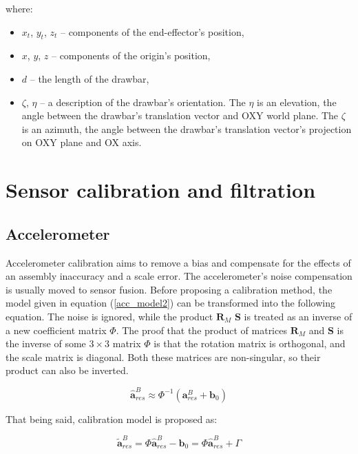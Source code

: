where:
\begin{itemize}
	\item $x_t$, $y_t$, $z_t$ -- components of the end-effector's position,
	\item $x$, $y$, $z$ -- components of the origin's position,
	\item $d$ -- the length of the drawbar,
	\item $\zeta$, $\eta$ -- a description of the drawbar's orientation. The $\eta$ is an elevation, the angle between the drawbar's translation vector and OXY world plane. The $\zeta$ is an azimuth, the angle between the drawbar's translation vector's projection on OXY plane and OX axis.
\end{itemize}



\section{Sensor calibration and filtration}



\subsection{Accelerometer}

Accelerometer calibration aims to remove a bias and compensate for the effects of an assembly inaccuracy and a scale error. The accelerometer's noise compensation is usually moved to sensor fusion. Before proposing a calibration method, the model given in equation (\ref{acc_model2}) can be transformed into the following equation. The noise is ignored, while the product $\bm{R}_M$ $\bm{S}$ is treated as an inverse of a new coefficient matrix $\bm{\varPhi}$. The proof that the product of matrices $\bm{R}_M$ and $\bm{S}$ is the inverse of some $3 \times 3$ matrix $\bm{\varPhi}$ is that the rotation matrix is orthogonal, and the scale matrix is diagonal. Both these matrices are non-singular, so their product can also be inverted.

\begin{equation}
	\bm{\hat{a}}_{res}^B \approx \bm{\varPhi}^{-1} \left( \bm{a}_{res}^B + \bm{b}_0 \right)
	\label{acc_calib}
\end{equation}

That being said, calibration model is proposed as:

\begin{equation}
	\bm{\tilde{a}}_{res}^B = \bm{\varPhi} \bm{\hat{a}}_{res}^B - \bm{b}_0 = \bm{\varPhi} \bm{\hat{a}}_{res}^B + \bm{\varGamma}
	\label{acc_calib2}
\end{equation}

